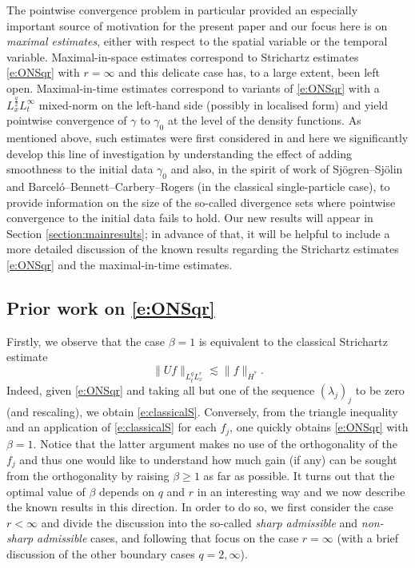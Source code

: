 \documentclass[a4paper]{amsart}
\numberwithin{equation}{section}%
\theoremstyle{plain}%
\theoremstyle{definition}
\theoremstyle{remark}%
\begin{document}
The pointwise convergence problem in particular provided an especially important source of motivation for the present paper and our focus here is on \emph{maximal estimates}, either with respect to the spatial variable or the temporal variable. Maximal-in-space estimates correspond to Strichartz estimates \eqref{e:ONSqr} with $r = \infty$ and this delicate case has, to a large extent, been left open. Maximal-in-time estimates correspond to variants of \eqref{e:ONSqr} with a $L^{\frac{q}{2}}_x L^\infty_t$ mixed-norm on the left-hand side (possibly in localised form) and yield pointwise convergence of $\gamma$ to $\gamma_0$ at the level of the density functions. As mentioned above, such estimates were first considered in \cite{BLN_Selecta} and here we significantly develop this line of investigation by understanding the effect of adding smoothness to the initial data $\gamma_0$ and also, in the spirit of work of Sj\"ogren--Sj\"olin \cite{SS89} and Barcel\'o--Bennett--Carbery--Rogers \cite{BBCR} (in the classical single-particle case), to provide information on the size of the so-called divergence sets where pointwise convergence to the initial data fails to hold. Our new results will appear in Section \ref{section:mainresults}; in advance of that, it will be helpful to include a more detailed discussion of the known results regarding the Strichartz estimates \eqref{e:ONSqr} and the maximal-in-time estimates.

\subsection{Prior work on \eqref{e:ONSqr}} 
Firstly, we observe that the case $\beta = 1$ is equivalent to the classical Strichartz estimate
\begin{equation} \label{e:classicalS}
\| Uf \|_{L^q_tL^r_x} \lesssim \|f\|_{\dot{H}^s}.
\end{equation}
Indeed, given \eqref{e:ONSqr} and taking all but one of the sequence $(\lambda_j)_j$ to be zero (and rescaling), we obtain \eqref{e:classicalS}. Conversely, from the triangle inequality and an application of \eqref{e:classicalS} for each $f_j$, one quickly obtains \eqref{e:ONSqr} with $\beta = 1$.  Notice that the latter argument makes no use of the orthogonality of the $f_j$ and thus one would like to understand how much gain (if any) can be sought from the orthogonality by raising $\beta \geq 1$ as far as possible. It turns out that the optimal value of $\beta$ depends on $q$ and $r$ in an interesting way and we now describe the known results in this direction. In order to do so, we first consider the case $r < \infty$ and divide the discussion into the so-called \emph{sharp admissible} and \emph{non-sharp admissible} cases, and following that focus on the case $r = \infty$ (with a brief discussion of the other boundary cases $q = 2,\infty$).
\end{document}
